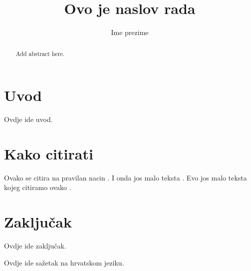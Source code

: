 \documentclass[times, utf8, diplomski, numeric]{templates/fer}
\begin{document}

\title{Ovo je naslov rada}

\author{Ime prezime}

\maketitle

\izvornik


\tableofcontents

\chapter{Uvod}
Ovdje ide uvod.

\chapter{Kako citirati}
Ovako se citira na pravilan nacin \cite{oetiket2007lshort}. I onda jos malo teksta \cite{downes2002shortams}. 
Evo jos malo teksta kojeg citiramo ovako \cite{ungar2002uvod}.

\chapter{Zaključak}
Ovdje ide zaključak.




\begin{sazetak}
Ovdje ide sažetak na hrvatskom jeziku.

\end{sazetak}

\begin{abstract}
Add abstract here.

\end{abstract}
\end{document}
